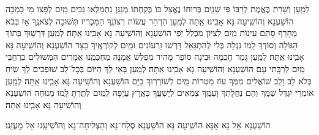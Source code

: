 \documentclass[twoside, openany, parskip=half, 11pt]{book}
\begin{document}
\begin{small}
לְמַֽעַן וְשֵׁרֵת בֶּאֱמֶת לְרַבּוֹ פִּי שְׁנַֽיִם בְּרוּחוֹ נֶאֱצַל בּוֹ
בְּקַחְתּוֹ מְנַגֵּן נִתְמַלְּאוּ גֵּבִים מַֽיִם לְפָצוּ מִי כָמֹֽכָה הוֹשַׁעְנָא וְהוֹשִֽׁיעָה נָּא אָבִֽינוּ אַֽתָּה׃
לְמַֽעַן הִרְהֵר עֲשׂוֹת רְצוֹנֶֽךָ הַמַּכְרִיז תְּשׁוּבָה לְצֹאנֶֽךָ
אָז בְּבֹא מְחָרֵף סָתַם עֵינוֹת מַֽיִם לְצִיּוֹן מִכְלַל יֹֽפִי הוֹשַׁעְנָא וְהוֹשִֽׁיעָה נָּא אָבִֽינוּ אַֽתָּה׃
לְמַֽעַן דְּרָשֽׁוּךָ בְּתוֹךְ הַגּוֹלָה וְסוֹדְךָ לָֽמוֹ נִגְלָה
בְּלִי לְהִתְגָּאֵל דָּרְשׁוּ זֵרְעוֹנִים וּמַֽיִם לְקוֹרְאֶֽיךָ בַצָּר הוֹשַׁעְנָא וְהוֹשִֽׁיעָה נָּא אָבִֽינוּ אַֽתָּה׃
לְמַֽעַן גָּמַר חׇכְמָה וּבִינָה סוֹפֵר מָהִיר מְפַלֵּשׂ אֲמָנָה
מְחַכְּמֵֽנוּ אֲמָרִים הַמְּשׁוּלִים בְּרַחֲבֵי מַֽיִם לְרַבָּֽתִי עָם הוֹשַׁעְנָא וְהוֹשִֽׁיעָה נָּא אָבִֽינוּ אַֽתָּה׃
לְמַֽעַן בָּאֵי לְךָ הַיּוֹם בְּכׇל־לֵב שׁוֹפְכִים לְךָ שִֽׂיחַ בְּלֹא לֵב וָלֵב
שׁוֹאֲלִים מִמְּךָ עוֹז מִטְרוֹת מַֽיִם לְשׁוֹרְרֽוּךָ בַיָּם הוֹשַׁעְנָא וְהוֹשִֽׁיעָה נָּא אָבִֽינוּ אַֽתָּה׃
לְמַֽעַן אוֹמְרֵי יִגְדַּל שְׁמֶֽךָ וְהֵם נַחֲלָתְךָ וְעַמֶּֽךָ
צְמֵאִים לְיֶשְׁעֲךָ כְּאֶֽרֶץ עֲיֵפָה לַמַּֽיִם לְתַֽרְתָּ לָֽמוֹ מְנוּחָה הוֹשַׁעְנָא וְהוֹשִֽׁיעָה נָּא אָבִֽינוּ אַֽתָּה׃

\end{small}

\begin{large}הוֹשַׁעְנָא אֵל נָא אָנָּא הוֹשִֽׁיעָה נָּא׃ הוֹשַׁעְנָא סְלַח־נָא וְהַצְלִיחָה־נָא וְהוֹשִׁיעֵֽנוּ אֵל מָעֻזֵּֽנוּ׃\end{large}
\end{document}

